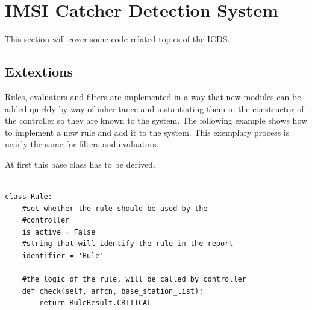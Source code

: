 \chapter{IMSI Catcher Detection System}
This section will cover some code related topics of the ICDS.

\section{Extextions}
\label{sec:extensions}
Rules, evaluators and filters are implemented in a way that new modules can be added quickly by way of inheritance and instantiating them in the constructor of the controller so they are known to the system.
The following example shows how to implement a new rule and add it to the system.
This exemplary process is nearly the same for filters and evaluators.

At first this base class has to be derived.\\\\
\hspace*{\dimexpr\fboxsep+\fboxrule}%
\begin{minipage}{\dimexpr\textwidth-4\fboxsep-2\fboxrule} 
\begin{lstlisting}
class Rule:
    #set whether the rule should be used by the 
    #controller
    is_active = False
    #string that will identify the rule in the report
    identifier = 'Rule'

    #the logic of the rule, will be called by controller
    def check(self, arfcn, base_station_list):
        return RuleResult.CRITICAL
\end{lstlisting}
\end{minipage}\\\\

